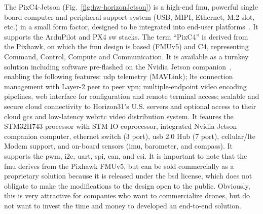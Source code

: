 \begin{enumerate}
  The PixC4-Jetson (Fig.~\ref{fig:hw-horizonJetson}) is a high-end \gls{fmu}, powerful single board computer and
  peripheral support system (USB, MIPI, Ethernet, M.2 slot, etc.) in a small
  form factor, designed to be integrated into end-user
  platforms~\cite{arduPilot-horizonJetson}. It supports the ArduPilot and PX4
  \gls{sw} stacks. The term
  ``PixC4'' is derived from the Pixhawk, on which the \gls{fmu} design is based
  (FMUv5) and C4, representing Command, Control, Compute and Communication. It
  is available as a turnkey solution including software pre-flashed on the
  Nvidia Jetson companion~\cite{arduPilot-horizonJetson}, enabling the following
  features: \gls{udp} telemetry (MAVLink); \gls{lte} connection management with
  Layer-2 peer to peer \gls{vpn}; multiple-endpoint video encoding pipelines, web
  interface for configuration and remote terminal access; scalable and secure
  cloud connectivity to Horizon31's U.S. servers and optional access to their
  cloud \gls{gcs} and low-latency web\gls{rtc} video distribution system. It
  feaures the STM32H743 processor with STM IO coprocessor, integrated Nvidia
  Jetson companion computer, ethernet switch (3 port), \gls{usb} 2.0 Hub (7
  port), cellular/\gls{lte} Modem support, and on-board sensors (\gls{imu},
  barometer, and compass). It supports the \gls{pwm}, \gls{i2c}, \gls{uart},
  \gls{spi}, \gls{can}, and \gls{csi}. It is important to note that the
  \gls{fmu} derives from the Pixhawk FMUv5, but can be sold commercially as
  a proprietary solution because it is released under the \gls{bsd} license,
  which does not obligate to make the modifications to the design open to the
  public. Obviously, this is very attractive for companies who want to
  commercialize drones, but do not want to invest the time and money to
  developed an end-to-end solution.
\end{enumerate}

